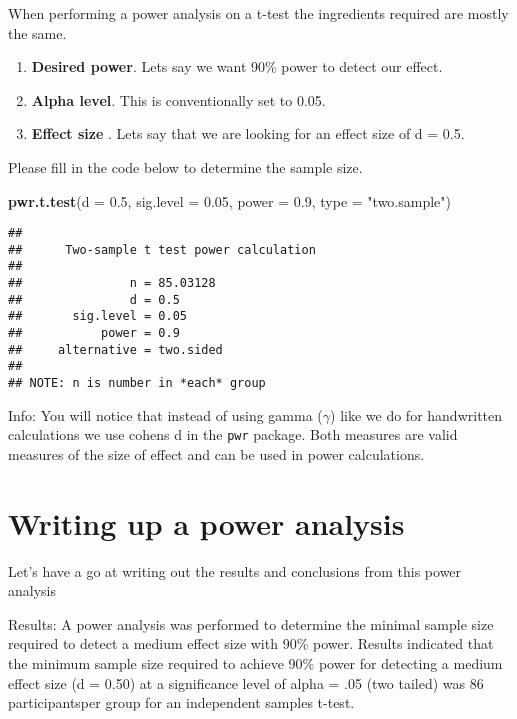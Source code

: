 \documentclass[
]{book}
\newenvironment{Shaded}{\begin{snugshade}}{\end{snugshade}}
\newcommand{\AttributeTok}[1]{\textcolor[rgb]{0.13,0.29,0.53}{#1}}
\newcommand{\FloatTok}[1]{\textcolor[rgb]{0.00,0.00,0.81}{#1}}
\newcommand{\FunctionTok}[1]{\textcolor[rgb]{0.13,0.29,0.53}{\textbf{#1}}}
\newcommand{\NormalTok}[1]{#1}
\newcommand{\StringTok}[1]{\textcolor[rgb]{0.31,0.60,0.02}{#1}}
\providecommand{\tightlist}{%
  \setlength{\itemsep}{0pt}\setlength{\parskip}{0pt}}
\begin{document}
When performing a power analysis on a t-test the ingredients required are mostly the same.

\begin{enumerate}
\def\labelenumi{\arabic{enumi}.}
\tightlist
\item
  \textbf{Desired power}. Lets say we want 90\% power to detect our effect.
\item
  \textbf{Alpha level}. This is conventionally set to 0.05.
\item
  \textbf{Effect size} . Lets say that we are looking for an effect size of d = 0.5.
\end{enumerate}

Please fill in the code below to determine the sample size.

\begin{Shaded}
\begin{Highlighting}[]
\FunctionTok{pwr.t.test}\NormalTok{(}\AttributeTok{d =} \FloatTok{0.5}\NormalTok{, }\AttributeTok{sig.level =} \FloatTok{0.05}\NormalTok{, }\AttributeTok{power =} \FloatTok{0.9}\NormalTok{, }\AttributeTok{type =} \StringTok{"two.sample"}\NormalTok{)}
\end{Highlighting}
\end{Shaded}

\begin{verbatim}
## 
##      Two-sample t test power calculation 
## 
##               n = 85.03128
##               d = 0.5
##       sig.level = 0.05
##           power = 0.9
##     alternative = two.sided
## 
## NOTE: n is number in *each* group
\end{verbatim}

Info: You will notice that instead of using gamma (\(\gamma\)) like we do for handwritten calculations we use cohens d in the \texttt{pwr} package. Both measures are valid measures of the size of effect and can be used in power calculations.

\section{Writing up a power analysis}\label{writing-up-a-power-analysis}

Let's have a go at writing out the results and conclusions from this power analysis

Results: A power analysis was performed to determine the minimal sample size required to detect a medium effect size with 90\% power. Results indicated that the minimum sample size required to achieve 90\% power for detecting a medium effect size (d = 0.50) at a significance level of alpha = .05 (two tailed) was 86 participantsper group for an independent samples t-test.
\end{document}
